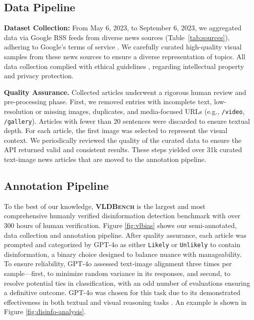 \subsection{Data Pipeline}  
\textbf{Dataset Collection:}  
From May 6, 2023, to September 6, 2023, we aggregated data via Google RSS feeds from diverse news sources (Table~\ref{tab:sources}), adhering to Google’s terms of service \cite{google_tos}. We carefully curated  high-quality visual samples from these news sources to ensure a diverse representation of topics. All data collection complied with ethical guidelines \cite{uwaterloo_ethics_review}, regarding intellectual property and privacy protection. 

\textbf{Quality Assurance.}  
Collected articles underwent a rigorous human review and pre-processing phase. First, we removed entries with incomplete text, low-resolution or missing images, duplicates, and media-focused URLs (e.g., \texttt{/video}, \texttt{/gallery}). Articles with fewer than 20 sentences were discarded to ensure textual depth. For each article, the first image was selected to represent the visual context. We periodically reviewed the quality of the curated data to ensure the API returned valid and consistent results. These steps yielded over 31k curated text-image news articles that are moved to the annotation pipeline.

\subsection{Annotation Pipeline}  
To the best of our knowledge, \textsf{\textbf{\textsc{VLDBench}}} is the largest and most comprehensive humanly verified disinformation detection benchmark with over 300 hours of human verification. Figure \ref{fig:vlbias} shows our semi-annotated, data collection and annotation pipeline. After quality assurance, each article was prompted and categorized by GPT-4o as either \texttt{Likely} or \texttt{Unlikely} to contain disinformation, a binary choice designed to balance nuance with manageability. To ensure reliability, GPT-4o assessed text-image alignment three times per sample—first, to minimize random variance in its responses, and second, to resolve potential ties in classification, with an odd number of evaluations ensuring a definitive outcome. GPT-4o was chosen for this task due to its demonstrated effectiveness in both textual \cite{kim2024meganno+} and visual reasoning tasks \cite{shahriar2024putting}. An example is shown in Figure \ref{fig:disinfo-analysis}.

